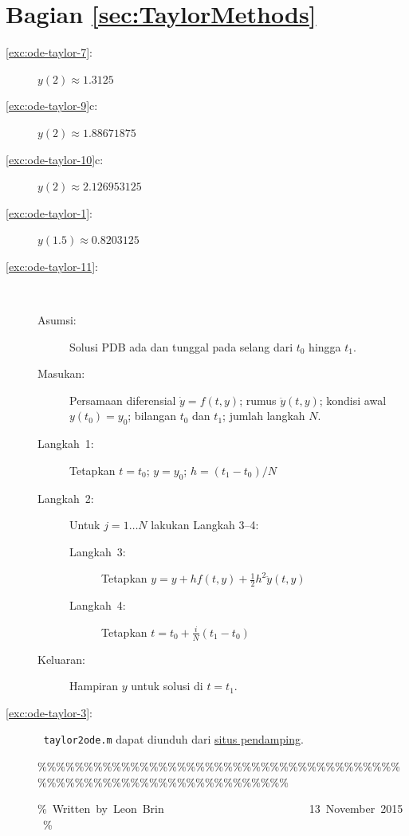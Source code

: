 \section*{Bagian \ref{sec:TaylorMethods}}
\begin{description}
\item [{\ref{exc:ode-taylor-7}:}] $y(2)\approx1.3125$
\item [{\ref{exc:ode-taylor-9}c:}] $y(2)\approx1.88671875$
\item [{\ref{exc:ode-taylor-10}c:}] $y(2)\approx2.126953125$
\item [{\ref{exc:ode-taylor-1}:}] $y(1.5)\approx0.8203125$
\item [{\ref{exc:ode-taylor-11}:}] $\ $

\begin{pseudocode} 
\begin{description}
\item [{Asumsi:}] Solusi PDB ada dan tunggal pada selang dari $t_{0}$
hingga $t_{1}$.
\item [{Masukan:}] Persamaan diferensial $\dot{y}=f(t,y)$; rumus $\ddot{y}(t,y)$;
kondisi awal $y(t_{0})=y_{0}$; bilangan $t_{0}$ dan $t_{1}$; jumlah
langkah $N$.
\item [{Langkah\ 1:}] Tetapkan $t=t_{0}$; $y=y_{0}$; $h=(t_{1}-t_{0})/N$
\item [{Langkah~2:}] Untuk $j=1\ldots N$ lakukan Langkah 3--4:

\begin{description}
\item [{Langkah~3:}] Tetapkan $y=y+hf(t,y)+\frac{1}{2}h^{2}\ddot{y}(t,y)$
\item [{Langkah~4:}] Tetapkan $t=t_{0}+\frac{i}{N}(t_{1}-t_{0})$
\end{description}
\item [{Keluaran:}] Hampiran $y$ untuk solusi di $t=t_{1}$.
\end{description}
\end{pseudocode} 
\item [{\ref{exc:ode-taylor-3}:}] $\ $
\texttt{taylor2ode.m} dapat diunduh dari \href{http://lqbrin.github.io/tea-time-numerical/ancillaries.html}{situs pendamping}.

\begin{lyxcode}
\%\%\%\%\%\%\%\%\%\%\%\%\%\%\%\%\%\%\%\%\%\%\%\%\%\%\%\%\%\%\%\%\%\%\%\%\%\%\%\%\%\%\%\%\%\%\%\%\%\%\%\%\%\%\%\%\%\%\%\%\%\%\%\%\%\%

\%~Written~by~Leon~Brin~~~~~~~~~~~~~~~~~~~~~~~~~~13~November~2015~\%


\end{lyxcode}
\end{description}
